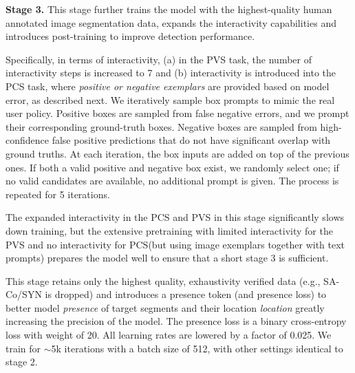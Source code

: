 \documentclass[]{fairmeta}
\newcommand{\eg}{e.g., }
\newcommand{\pvstask}{PVS\xspace}
\newcommand{\task}{PCS\xspace}
\newcommand{\dsname}{{SA-Co}\xspace}
\newcommand{\trainsyn}{{\dsname/SYN}\xspace}
\renewcommand{\paragraph}[1]{%
	\noindent\textbf{#1.}\noindent\xspace%
}
\begin{document}
\paragraph{Stage 3} This stage further trains the model with the highest-quality human annotated image segmentation data, expands the interactivity capabilities and introduces post-training to improve detection performance.

Specifically, in terms of interactivity, (a) in the PVS task, the number of interactivity steps is increased to 7 and (b) interactivity is introduced into the \task task, where \textit{positive or negative exemplars} are provided based on model error, as described next. We iteratively sample box prompts to mimic the real user policy. Positive boxes are sampled from false negative errors, and we prompt their corresponding ground-truth boxes. Negative boxes are sampled from high-confidence false positive predictions that do not have significant overlap with ground truths. At each iteration, the box inputs are added on top of the previous ones. If both a valid positive and negative box exist, we randomly select one; if no valid candidates are available, no additional prompt is given. The process is repeated for 5 iterations. 

The expanded interactivity in the \task and \pvstask in this stage significantly slows down training, but the extensive pretraining with limited interactivity for the \pvstask and no interactivity for \task (but using image exemplars together with text prompts) prepares the model well to ensure that a short stage 3 is sufficient.

This stage retains only the highest quality, exhaustivity verified data (\eg \trainsyn is dropped) and introduces a presence token (and presence loss) to better model \textit{presence} of target segments and their location \textit{location} greatly increasing the precision of the model. The presence loss is a binary cross-entropy loss with weight of 20. All learning rates are lowered by a factor of 0.025. We train for $\sim$5k iterations with a batch size of 512, with other settings identical to stage 2.
\end{document}
